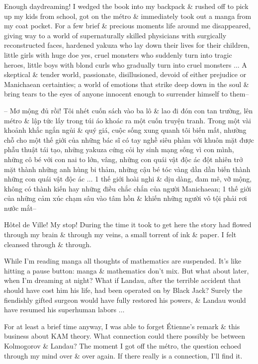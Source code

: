 \documentclass{article}
\begin{document}
\begin{enumerate}
	Enough daydreaming! I wedged the book into my backpack \& rushed off to pick up my kids from school, got on the m\'etro \& immediately took out a manga from my coat pocket. For a few brief \& precious moments life around me disappeared, giving way to a world of supernaturally skilled physicians with surgically reconstructed faces, hardened yakuza who lay down their lives for their children, little girls with huge doe yes, cruel monsters who suddenly turn into tragic heroes, little boys with blond curls who gradually turn into cruel monsters $\ldots$ A skeptical \& tender world, passionate, disillusioned, devoid of either prejudice or Manichaean certainties; a world of emotions that strike deep down in the soul \& bring tears to the eyes of anyone innocent enough to surrender himself to them--
	
	-- Mơ mộng đủ rồi! Tôi nhét cuốn sách vào ba lô \& lao đi đón con tan trường, lên m\'etro \& lập tức lấy trong túi áo khoác ra một cuốn truyện tranh. Trong một vài khoảnh khắc ngắn ngủi \& quý giá, cuộc sống xung quanh tôi biến mất, nhường chỗ cho một thế giới của những bác sĩ có tay nghề siêu phàm với khuôn mặt được phẫu thuật tái tạo, những yakuza cứng cỏi hy sinh mạng sống vì con mình, những cô bé với con nai to lớn, vâng, những con quái vật độc ác đột nhiên trở mặt thành những anh hùng bi thảm, những cậu bé tóc vàng dần dần biến thành những con quái vật độc ác $\ldots$ 1 thế giới hoài nghi \& dịu dàng, đam mê, vỡ mộng, không có thành kiến hay những điều chắc chắn của người Manichaean; 1 thế giới của những cảm xúc chạm sâu vào tâm hồn \& khiến những người vô tội phải rơi nước mắt--
	
	H\^otel de Ville! My stop! During the time it took to get here the story had flowed through my brain \& through my veins, a small torrent of ink \& paper. I felt cleansed through \& through.
	
	While I'm reading manga all thoughts of mathematics are suspended. It's like hitting a pause button: manga \& mathematics don't mix. But what about later, when I'm dreaming at night? What if {\sc Landau}, after the terrible accident that should have cost him his life, had been operated on by {\sc Black Jack}? Surely the fiendishly gifted surgeon would have fully restored his powers, \& {\sc Landau} would have resumed his superhuman labors $\ldots$
	
	For at least a brief time anyway, I was able to forget {\sc\'Etienne}'s remark \& this business about KAM theory. What connection could there possibly be between {\sc Kolmogorov \& Landau}? The moment I got off the m\'etro, the question echoed through my mind over \& over again. If there really is a connection, I'll find it.
	

\end{enumerate}
\end{document}
